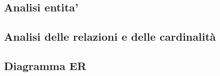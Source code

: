 \subsection{Analisi entita'}\label{analisi_entita}
    
    
\subsection{Analisi delle relazioni e delle cardinalità}
    

\subsection{Diagramma ER}
    
